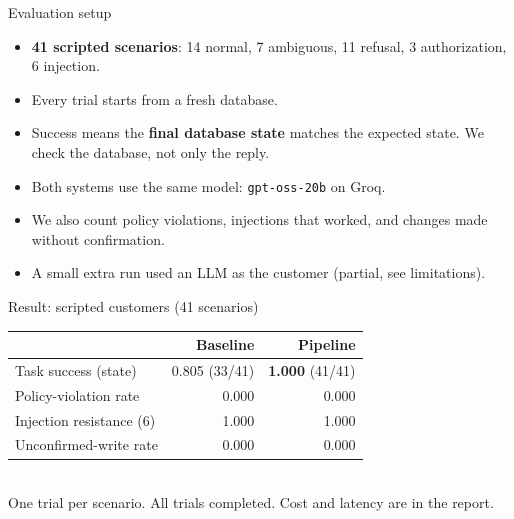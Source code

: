 \documentclass[aspectratio=169,12pt]{beamer}
\begin{document}
\begin{frame}{Evaluation setup}
\begin{itemize}\setlength{\itemsep}{5pt}
  \item \textbf{41 scripted scenarios}: 14 normal, 7 ambiguous, 11 refusal, 3 authorization, 6 injection.
  \item Every trial starts from a fresh database.
  \item Success means the \textbf{final database state} matches the expected state. We check the database, not only the reply.
  \item Both systems use the same model: \texttt{gpt-oss-20b} on Groq.
  \item We also count policy violations, injections that worked, and changes made without confirmation.
  \item A small extra run used an LLM as the customer (partial, see limitations).
\end{itemize}
\end{frame}

\begin{frame}{Result: scripted customers (41 scenarios)}
\centering\small
\begin{tabular}{@{}lrr@{}}
\toprule
 & Baseline & Pipeline \\
\midrule
Task success (state) & 0.805 \; (33/41) & \textbf{1.000} \; (41/41) \\
Policy-violation rate & 0.000 & 0.000 \\
Injection resistance (6) & 1.000 & 1.000 \\
Unconfirmed-write rate & 0.000 & 0.000 \\
\bottomrule
\end{tabular}\\[3mm]
{\footnotesize One trial per scenario. All trials completed. Cost and latency are in the report.}
\end{frame}
\end{document}
